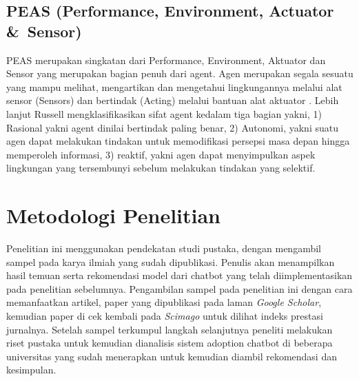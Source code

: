 \documentclass[conference]{IEEEtran}
\begin{document}
\subsection{PEAS (Performance, Environment, Actuator \&\ Sensor)}
PEAS merupakan singkatan dari Performance, Environment, Aktuator dan Sensor yang merupakan bagian  penuh dari agent. Agen merupakan segala sesuatu yang mampu melihat, mengartikan dan mengetahui lingkungannya melalui alat sensor (Sensors) dan bertindak (Acting) melalui bantuan alat aktuator \cite{b18}. Lebih lanjut Russell mengklasifikasikan sifat agent kedalam tiga bagian yakni, 1) Rasional yakni agent dinilai bertindak paling benar, 2) Autonomi, yakni suatu agen dapat melakukan tindakan untuk memodifikasi persepsi masa depan hingga memperoleh informasi, 3) reaktif, yakni agen dapat menyimpulkan aspek lingkungan yang tersembunyi sebelum melakukan tindakan yang selektif.

\section{Metodologi Penelitian}
Penelitian ini menggunakan pendekatan studi pustaka, dengan mengambil sampel pada karya ilmiah yang sudah dipublikasi. Penulis akan menampilkan hasil temuan serta rekomendasi model dari chatbot yang telah diimplementasikan pada penelitian sebelumnya. Pengambilan sampel pada penelitian ini dengan cara memanfaatkan artikel, paper yang dipublikasi pada laman \emph{Google Scholar}, kemudian paper di cek kembali pada \emph{Scimago} untuk dilihat indeks prestasi jurnalnya. Setelah sampel terkumpul langkah selanjutnya peneliti melakukan riset pustaka untuk kemudian dianalisis sistem adoption chatbot di beberapa universitas yang sudah menerapkan untuk kemudian diambil rekomendasi dan kesimpulan.
\end{document}
